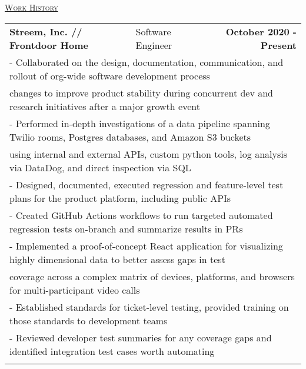 \documentclass[letterpaper]{article}
\begin{document}
	\begin{center}
		\vspace{0.0in}
		\underline{\large \scshape Work History}
		\begin{tabular}{p{}p{}r}
			\\
				\textbf{Streem, Inc. // Frontdoor Home} &
				\quad\quad\quad\quad\quad\quad Software Engineer &
				\textbf{October 2020 - Present\quad}
			\\
				\multicolumn{3}{p{\textwidth}}{\quad\quad - Collaborated on the design, documentation, communication, and rollout of org-wide software development process}
			\\
				\multicolumn{3}{p{\textwidth}}{\quad\quad\quad changes to improve product stability during concurrent dev and research initiatives after a major growth event} 
			\\
				\multicolumn{3}{p{\textwidth}}{\quad\quad - Performed in-depth investigations of a data pipeline spanning Twilio rooms, Postgres databases, and Amazon S3 buckets}  
			\\
				\multicolumn{3}{p{\textwidth}}{\quad\quad\quad using internal and external APIs, custom python tools, log analysis via DataDog, and direct inspection via SQL}
			\\
				\multicolumn{3}{p{\textwidth}}{\quad\quad - Designed, documented, executed regression and feature-level test plans for the product platform, including public APIs} 
			\\
				\multicolumn{3}{p{\textwidth}}{\quad\quad - Created GitHub Actions workflows to run targeted automated regression tests on-branch and summarize results in PRs}
			\\
			    \multicolumn{3}{p{\textwidth}}{\quad\quad - Implemented a proof-of-concept React application for visualizing highly dimensional data to better assess gaps in test}
			\\
				\multicolumn{3}{p{\textwidth}}{\quad\quad\quad  coverage across a complex matrix of devices, platforms, and browsers for multi-participant video calls }
			\\
				\multicolumn{3}{p{\textwidth}}{\quad\quad - Established standards for ticket-level testing, provided training on those standards to development teams}
			\\
				\multicolumn{3}{p{\textwidth}}{\quad\quad - Reviewed developer test summaries for any coverage gaps and identified integration test cases worth automating}
			\\
			\\

\end{tabular}
\end{center}
\end{document}
